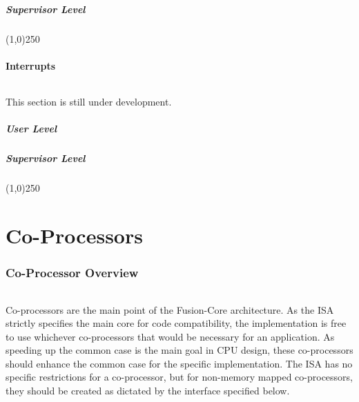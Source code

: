 \documentclass[letterpaper, 11pt]{article}
\begin{document}
\subsubsection{Supervisor Level}

\begin{center}
	\line(1,0){250}
\end{center}

\subsection{Interrupts}
\paragraph{} This section is still under development.
\subsubsection{User Level}
\subsubsection{Supervisor Level}

\begin{center}
	\line(1,0){250}
\end{center}

\clearpage
\part{Co-Processors}
\section{Co-Processor Overview}
\paragraph{}Co-processors are the main point of the Fusion-Core architecture. As the ISA strictly specifies the main core for code compatibility,
the implementation is free to use whichever co-processors that would be necessary for an application. As speeding up the common case is the main goal in CPU design,
these co-processors should enhance the common case for the specific implementation. The ISA has no specific restrictions for a co-processor, but for non-memory
mapped co-processors, they should be created as dictated by the interface specified below.
\end{document}
